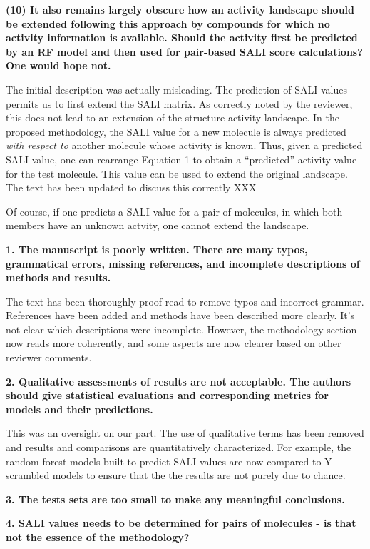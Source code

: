 \documentclass[letterpaper, 12pt]{article}
\begin{document}
\textbf{(10) It also remains largely obscure how an activity landscape should be extended following
  this approach by compounds for which no activity information is available. Should the activity
  first be predicted by an RF model and then used for pair-based SALI score calculations?  One would
  hope not.}

The initial description was actually misleading. The prediction of SALI values permits us to first
extend the SALI matrix. As correctly noted by the reviewer, this does not lead to an extension of
the structure-activity landscape. In the proposed methodology, the SALI value for a new molecule is
always predicted \emph{with respect to} another molecule whose activity is known. Thus, given a
predicted SALI value, one can rearrange Equation 1 to obtain a ``predicted'' activity value for the
test molecule. This value can be used to extend the original landscape. The text has been updated to
discuss this correctly XXX

Of course, if one predicts a SALI value for a pair of molecules, in which both members have an
unknown actvity, one cannot extend the landscape. 


\textbf{1.  The manuscript is poorly written.  There are many typos, grammatical errors, missing
  references, and incomplete descriptions of methods and results.}

The text has been thoroughly proof read to remove typos and incorrect grammar. References have been
added and methods have been described more clearly. It's not clear which descriptions were
incomplete. However, the methodology section now reads more coherently, and some aspects are now
clearer based on other reviewer comments.

\textbf{2.  Qualitative assessments of results are not acceptable.  The authors should give
  statistical evaluations and corresponding metrics for models and their predictions.}

This was an oversight on our part. The use of qualitative terms has been removed and results and
comparisons are quantitatively characterized. For example, the random forest models built to predict
SALI values are now compared to Y-scrambled models to ensure that the the results are not purely due
to chance.

\textbf{3.  The tests sets are too small to make any meaningful conclusions.}

\textbf{4.  SALI values needs to be determined for pairs of molecules - is that not the essence of
  the methodology?}
\end{document}
